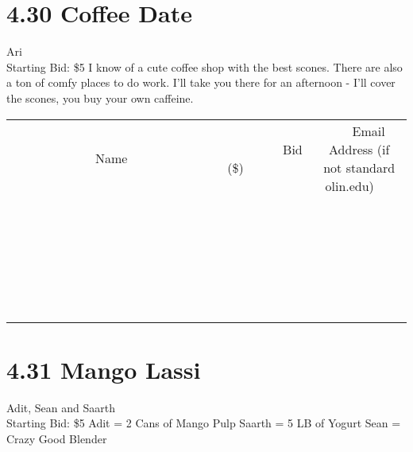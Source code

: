 \documentclass[11pt]{article}
\begin{document}
\section*{4.30 Coffee Date}
Ari
\\
Starting Bid: \$5
\newline
I know of a cute coffee shop with the best scones. There are also a ton of comfy places to do work. I'll take you there for an afternoon - I'll cover the scones, you buy your own caffeine.
\\[6ex]
\begin{tabular}{c c c}
~~~~~~~~~~~~~Name~~~~~~~~~~~~~ & ~~~~~~~~~Bid (\$)~~~~~~~~~  & ~~~Email Address (if not standard olin.edu)~~~\\
 & & \\
\hline
 & & \\
\hline
 & & \\
\hline
 & & \\
\hline
 & & \\
\hline
 & & \\
\hline
 & & \\
\hline
 & & \\
\hline
 & & \\
\hline
 & & \\
\hline
 & & \\
\hline
 & & \\
\hline
 & & \\
\hline
 & & \\
\hline
 & & \\
\hline
 & & \\
\hline
 & & \\
\hline
 & & \\
\hline
 & & \\
\hline
 & & \\
\hline
 & & \\
\hline
 & & \\
\hline
 & & \\
\hline
 & & \\
\hline
 & & \\
\hline
 & & \\
\hline
\end{tabular}
\newpage
\section*{4.31 Mango Lassi}
Adit, Sean and Saarth
\\
Starting Bid: \$5
\newline
Adit = 2 Cans of Mango Pulp
Saarth = 5 LB of Yogurt
Sean = Crazy Good Blender
\end{document}
